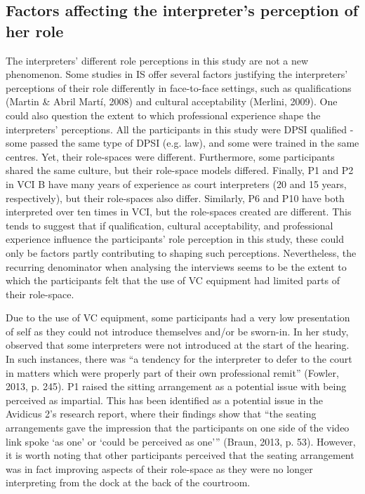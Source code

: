 \documentclass[output=paper]{langsci/langscibook}
\begin{document}
\subsection{Factors affecting the interpreter’s perception of her role}
The interpreters’ different role perceptions in this study are not a new phenomenon. Some studies in IS offer several factors justifying the interpreters’ perceptions of their role differently in face-to-face settings, such as qualifications (Martin \& Abril Martí, 2008) and cultural acceptability (Merlini, 2009). One could also question the extent to which professional experience shape the interpreters’ perceptions. All the participants in this study were DPSI qualified - some passed the same type of DPSI (e.g. law), and some were trained in the same centres. Yet, their role-spaces were different. Furthermore, some participants shared the same culture, but their role-space models differed. Finally, P1 and P2 in VCI B have many years of experience as court interpreters (20 and 15 years, respectively), but their role-spaces also differ. Similarly, P6 and P10 have both interpreted over ten times in VCI, but the role-spaces created are different. This tends to suggest that if qualification, cultural acceptability, and professional experience influence the participants’ role perception in this study, these could only be factors partly contributing to shaping such perceptions. Nevertheless, the recurring denominator when analysing the interviews seems to be the extent to which the participants felt that the use of VC equipment had limited parts of their role-space. 

Due to the use of VC equipment, some participants had a very low presentation of self as they could not introduce themselves and/or be sworn-in. In her study, \citet{Fowler2013} observed that some interpreters were not introduced at the start of the hearing. In such instances, there was “a tendency for the interpreter to defer to the court in matters which were properly part of their own professional remit” (Fowler, 2013, p. 245). P1 raised the sitting arrangement as a potential issue with being perceived as impartial. This has been identified as a potential issue in the Avidicus 2’s research report, where their findings show that “the seating arrangements gave the impression that the participants on one side of the video link spoke ‘as one’ or ‘could be perceived as one’” (Braun, 2013, p. 53). However, it is worth noting that other participants perceived that the seating arrangement was in fact improving aspects of their role-space as they were no longer interpreting from the dock at the back of the courtroom.
\end{document}
